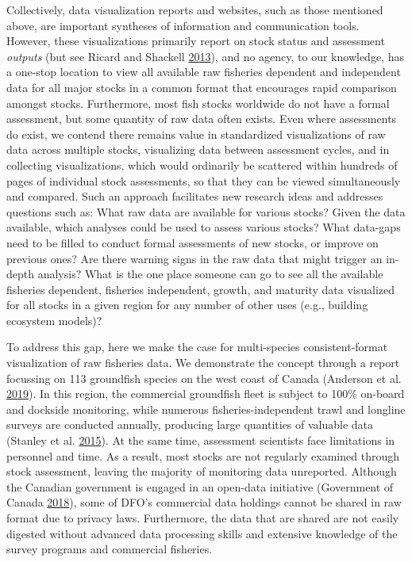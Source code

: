 \documentclass[12pt,]{article}
\begin{document}
Collectively, data visualization reports and websites, such as those mentioned above, are important syntheses of information and communication tools.
However, these visualizations primarily report on stock status and assessment \emph{outputs} (but see Ricard and Shackell \protect\hyperlink{ref-ricard2013}{2013}), and no agency, to our knowledge, has a one-stop location to view all available raw fisheries dependent and independent data for all major stocks in a common format that encourages rapid comparison amongst stocks.
Furthermore, most fish stocks worldwide do not have a formal assessment, but some quantity of raw data often exists.
Even where assessments do exist, we contend there remains value in standardized visualizations of raw data across multiple stocks, visualizing data between assessment cycles, and in collecting visualizations, which would ordinarily be scattered within hundreds of pages of individual stock assessments, so that they can be viewed simultaneously and compared.
Such an approach facilitates new research ideas and addresses questions such as:
What raw data are available for various stocks? Given the data available, which analyses could be used to assess various stocks?
What data-gaps need to be filled to conduct formal assessments of new stocks, or improve on previous ones?
Are there warning signs in the raw data that might trigger an in-depth analysis?
What is the one place someone can go to see all the available fisheries dependent, fisheries independent, growth, and maturity data visualized for all stocks in a given region for any number of other uses (e.g., building ecosystem models)?

To address this gap, here we make the case for multi-species consistent-format visualization of raw fisheries data. We demonstrate the concept through a report focussing on 113 groundfish species on the west coast of Canada (Anderson et al. \protect\hyperlink{ref-anderson2019synopsis}{2019}).
In this region, the commercial groundfish fleet is subject to 100\% on-board and dockside monitoring, while numerous fisheries-independent trawl and longline surveys are conducted annually, producing large quantities of valuable data (Stanley et al. \protect\hyperlink{ref-stanley2015}{2015}).
At the same time, assessment scientists face limitations in personnel and time.
As a result, most stocks are not regularly examined through stock assessment, leaving the majority of monitoring data unreported.
Although the Canadian government is engaged in an open-data initiative (Government of Canada \protect\hyperlink{ref-canada2018}{2018}), some of DFO's commercial data holdings cannot be shared in raw format due to privacy laws.
Furthermore, the data that are shared are not easily digested without advanced data processing skills and extensive knowledge of the survey programs and commercial fisheries.
\end{document}
